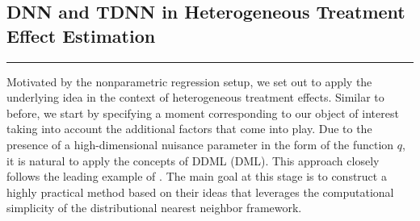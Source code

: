 \subsection{DNN and TDNN in Heterogeneous Treatment Effect Estimation}
\hrule
Motivated by the nonparametric regression setup, we set out to apply the underlying idea in the context of heterogeneous treatment effects.
Similar to before, we start by specifying a moment corresponding to our object of interest taking into account the additional factors that come into play.
Due to the presence of a high-dimensional nuisance parameter in the form of the function $q$, it is natural to apply the concepts of DDML (DML).
This approach closely follows the leading example of \citet{ritzwoller_simultaneous_2024}.
The main goal at this stage is to construct a highly practical method based on their ideas that leverages the computational simplicity of the distributional nearest neighbor framework.\\

